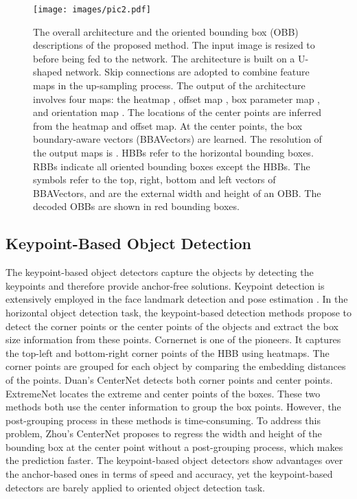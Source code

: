 \documentclass[10pt,twocolumn,letterpaper]{article}
\begin{document}
\begin{figure*}[t!]
\begin{center}
   \texttt{[image: images/pic2.pdf]}
\end{center}
\caption{The overall architecture and the oriented bounding box (OBB) descriptions of the proposed method. The input image is resized to  before being fed to the network. The architecture is built on a U-shaped network. Skip connections are adopted to combine feature maps in the up-sampling process. The output of the architecture involves four maps: the heatmap , offset map , box parameter map , and orientation map . The locations of the center points are inferred from the heatmap and offset map. At the center points, the box boundary-aware vectors (BBAVectors) are learned. The resolution of the output maps is . HBBs refer to the horizontal bounding boxes. RBBs indicate all oriented bounding boxes except the HBBs. The symbols  refer to the top, right, bottom and left vectors of BBAVectors,  and  are the external width and height of an OBB. The decoded OBBs are shown in red bounding boxes.}
\label{fig:figure2}
\end{figure*}


\subsection{Keypoint-Based Object Detection}
The keypoint-based object detectors \cite{law2018cornernet,zhou2019bottom,zhou2019objects,yi2019multi} capture the objects by detecting the keypoints and therefore provide anchor-free solutions. Keypoint detection is extensively employed in the face landmark detection \cite{merget2018robust} and pose estimation \cite{newell2016stacked,sun2018integral}. In the horizontal object detection task, the keypoint-based detection methods propose to detect the corner points or the center points of the objects and extract the box size information from these points. Cornernet \cite{law2018cornernet} is one of the pioneers. It captures the top-left and bottom-right corner points of the HBB using heatmaps. The corner points are grouped for each object by comparing the embedding distances of the points. Duan's CenterNet \cite{duan2019centernet} detects both corner points and center points. ExtremeNet \cite{zhou2019bottom} locates the extreme and center points of the boxes. These two methods both use the center information to group the box points. However, the post-grouping process in these methods is time-consuming. To address this problem, Zhou's CenterNet \cite{zhou2019objects} proposes to regress the width and height of the bounding box at the center point without a post-grouping process, which makes the prediction faster. The keypoint-based object detectors show advantages over the anchor-based ones in terms of speed and accuracy, yet the keypoint-based detectors are barely applied to oriented object detection task.
\end{document}

